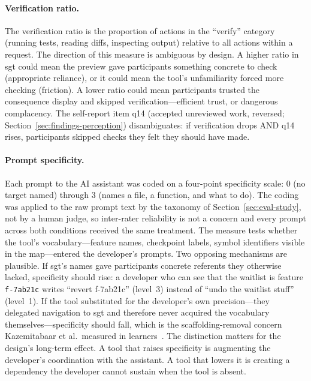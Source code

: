 \paragraph{Verification ratio.}
The verification ratio is the proportion of actions in the ``verify'' category
(running tests, reading diffs, inspecting output) relative to all actions within
a request. The direction of this measure is ambiguous by design. A higher ratio
in sgt could mean the preview gave participants something concrete to check
(appropriate reliance), or it could mean the tool's unfamiliarity
forced more checking (friction). A lower ratio could mean participants
trusted the consequence display and skipped verification---efficient trust, or
dangerous complacency. The self-report item q14 (accepted unreviewed work,
reversed; Section~\ref{sec:findings-perception})
disambiguates: if verification drops AND q14 rises, participants skipped checks
they felt they should have made.

\paragraph{Prompt specificity.}
Each prompt to the AI assistant was coded on a four-point specificity scale: 0
(no target named) through 3 (names a file, a function, and what to do). The
coding was applied to the raw prompt text by the taxonomy of
Section~\ref{sec:eval-study}, not by a human judge, so inter-rater reliability
is not a concern and every prompt across both conditions received the same
treatment. The measure tests whether the tool's vocabulary---feature names,
checkpoint labels, symbol identifiers visible in the map---entered the
developer's prompts. Two opposing mechanisms are plausible. If sgt's names gave
participants concrete referents they otherwise lacked, specificity should rise:
a developer who can see that the waitlist is feature \texttt{f-7ab21c}
writes ``revert f-7ab21c'' (level~3) instead of ``undo the waitlist stuff''
(level~1). If the tool substituted for the developer's own precision---they
delegated navigation to sgt and therefore never acquired the vocabulary
themselves---specificity should fall, which is the scaffolding-removal concern
Kazemitabaar et al.\ measured in learners~\cite{kazemitabaar2025}. The
distinction matters for the design's long-term effect. A tool that raises
specificity is augmenting the developer's coordination with the assistant. A
tool that lowers it is creating a dependency the developer cannot sustain when
the tool is absent.

